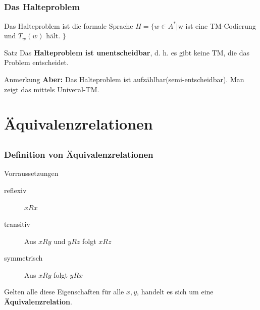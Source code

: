 \subsection*{}
\begin{frame}
  \frametitle{Das Halteproblem}

  \begin{block}{Das Halteproblem ist die formale Sprache}
  $H = \{w \in A^* | $w ist eine TM-Codierung und $T_w(w)$ hält. $\}$
   \end{block}
   \pause
   \begin{block}{Satz}
  Das \textbf{Halteproblem ist unentscheidbar}, d. h. es gibt keine TM, die das Problem entscheidet.
   \end{block}
   \pause
   \begin{block}{Anmerkung}
  \textbf{Aber:} Das Halteproblem ist aufzählbar(semi-entscheidbar). Man zeigt das mittels Univeral-TM.
   \end{block}
\end{frame}


\section[Relationen]{Äquivalenzrelationen}

\subsection*{}
\begin{frame}
  \frametitle{Definition von Äquivalenzrelationen}

	\begin{block}{Vorraussetzungen}
		\begin{description}
			\item[reflexiv] $x R x$
			\item[transitiv] Aus $x R y$ und $y R z$ folgt $x R z$
			\item[symmetrisch] Aus $x R y$ folgt $y R x$
		\end{description} \pause
		Gelten alle diese Eigenschaften für alle $x,y$, handelt es sich um eine \textbf{Äquivalenzrelation}.
	\end{block}
\end{frame}


